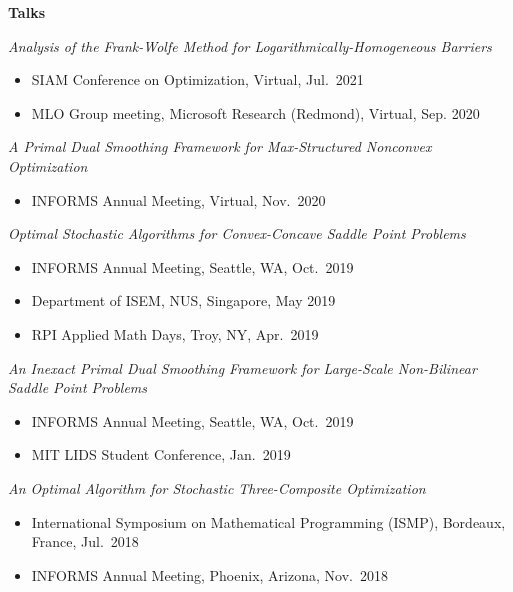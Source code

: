 \documentclass[11pt]{article}
\begin{document}
\begin{minipage}[t]{0.18\textwidth}
\textbf{Talks}
\end{minipage}
\begin{minipage}[t]{0.8\textwidth}
{\em Analysis of the Frank-Wolfe Method for Logarithmically-Homogeneous Barriers}
\begin{itemize}
\item SIAM Conference on Optimization, Virtual, Jul.\ 2021
\item MLO Group meeting, Microsoft Research (Redmond), Virtual, Sep. 2020
\end{itemize}
    



{\em A Primal Dual Smoothing Framework for Max-Structured Nonconvex Optimization}
\begin{itemize}
\item INFORMS Annual Meeting, Virtual, Nov.\ 2020 
\end{itemize}

{\em Optimal Stochastic Algorithms for Convex-Concave Saddle Point Problems} 
\begin{itemize}
\item INFORMS Annual Meeting, Seattle, WA, Oct.\ 2019
\item Department of ISEM, NUS, Singapore, May 2019
\item RPI Applied Math Days, Troy, NY, Apr.\ 2019
\end{itemize}
    



{\em An Inexact Primal Dual Smoothing Framework for Large-Scale Non-Bilinear Saddle Point Problems}
\begin{itemize}
\item INFORMS Annual Meeting, Seattle, WA, Oct.\ 2019 
\item MIT LIDS Student Conference, Jan.\ 2019
\end{itemize}

{\em An Optimal Algorithm for Stochastic Three-Composite Optimization}
\begin{itemize}
\item International Symposium on Mathematical Programming (ISMP), Bordeaux, France, Jul.\ 2018
\item INFORMS Annual Meeting, Phoenix, Arizona, Nov.\ 2018
\end{itemize}
\end{minipage}
\vspace{.5cm}
\end{document}
